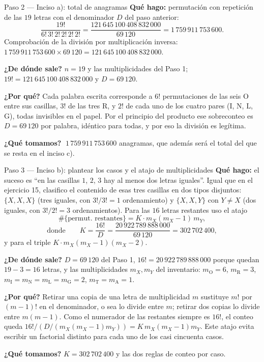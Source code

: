 \documentclass[11pt]{article}
\begin{document}
\begin{paso}{Paso 2 --- Inciso a): total de anagramas}
\textbf{Qué hago:} permutación con repetición de las $19$ letras con el denominador $D$ del paso anterior:
\[
\frac{19!}{6!\,3!\,2!\,2!\,2!\,2!}=\frac{121\,645\,100\,408\,832\,000}{69\,120}=1\,759\,911\,753\,600 .
\]
Comprobación de la división por multiplicación inversa:
$1\,759\,911\,753\,600\times 69\,120=121\,645\,100\,408\,832\,000$.

\textbf{¿De dónde sale?} $n=19$ y las multiplicidades del Paso 1; $19!=121\,645\,100\,408\,832\,000$ y
$D=69\,120$.

\textbf{¿Por qué?} Cada palabra escrita corresponde a $6!$ permutaciones de las seis O entre sus casillas,
$3!$ de las tres R, y $2!$ de cada uno de los cuatro pares (I, N, L, G), todas invisibles en el papel. Por
el principio del producto ese sobreconteo es $D=69\,120$ por palabra, idéntico para todas, y por eso la
división es legítima.

\textbf{¿Qué tomamos?} $\;1\,759\,911\,753\,600$ anagramas, que además será el total del que se resta en el
inciso c).
\end{paso}

\begin{paso}{Paso 3 --- Inciso b): plantear los casos y el atajo de multiplicidades}
\textbf{Qué hago:} el suceso es ``en las casillas $1$, $2$, $3$ hay al menos dos letras iguales''. Igual
que en el ejercicio 15, clasifico el contenido de esas tres casillas en dos tipos disjuntos: $\{X,X,X\}$
(tres iguales, con $3!/3!=1$ ordenamiento) y $\{X,X,Y\}$ con $Y\neq X$ (dos iguales, con $3!/2!=3$
ordenamientos). Para las $16$ letras restantes uso el atajo
\[
\#\{\text{permut. restantes}\}=K\cdot m_X(m_X-1)\,m_Y ,
\]
\[
\text{donde}\qquad K=\frac{16!}{D}=\frac{20\,922\,789\,888\,000}{69\,120}=302\,702\,400 ,
\]
y para el triple $K\cdot m_X(m_X-1)(m_X-2)$.

\textbf{¿De dónde sale?} $D=69\,120$ del Paso 1, $16!=20\,922\,789\,888\,000$ porque quedan $19-3=16$
letras, y las multiplicidades $m_X,m_Y$ del inventario: $m_{\text{O}}=6$, $m_{\text{R}}=3$,
$m_{\text{I}}=m_{\text{N}}=m_{\text{L}}=m_{\text{G}}=2$, $m_{\text{T}}=m_{\text{A}}=1$.

\textbf{¿Por qué?} Retirar una copia de una letra de multiplicidad $m$ sustituye $m!$ por $(m-1)!$ en el
denominador, o sea lo divide entre $m$; retirar dos copias lo divide entre $m(m-1)$. Como el numerador de
las restantes siempre es $16!$, el conteo queda $16!/(D/(m_X(m_X-1)m_Y))=K\,m_X(m_X-1)m_Y$. Este atajo
evita escribir un factorial distinto para cada uno de los casi cincuenta casos.

\textbf{¿Qué tomamos?} $K=302\,702\,400$ y las dos reglas de conteo por caso.
\end{paso}
\end{document}
